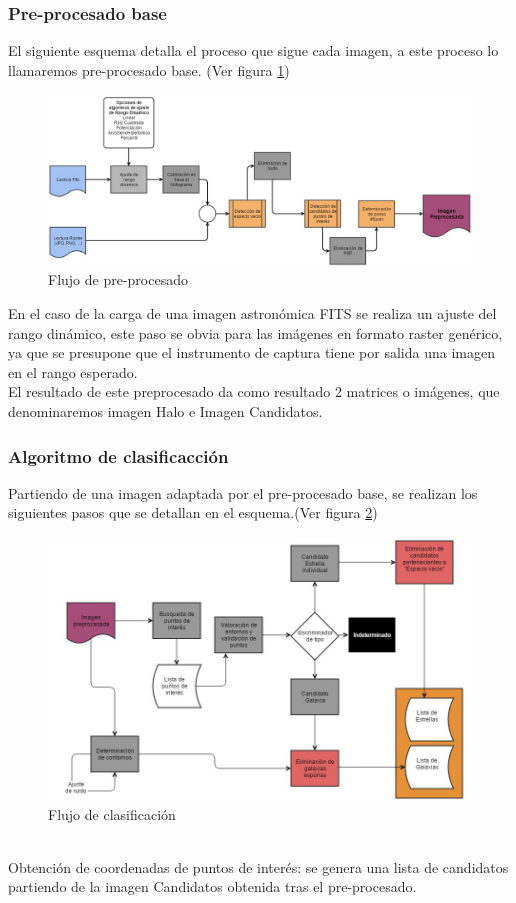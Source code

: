 	\subsubsection{Pre-procesado base}
	El siguiente esquema detalla el proceso que sigue cada imagen, a este proceso lo llamaremos pre-procesado base. (Ver figura \ref{fig:esquemaPreprocesado})\\
	\begin{figure}[!htb]
		\centering
		\includegraphics[width=1\textwidth]{images/tfg2016pipeline1.jpg}
		\caption{\label{fig:esquemaPreprocesado}Flujo de pre-procesado}
	\end{figure}
	En el caso de la carga de una imagen astronómica FITS se realiza un ajuste del rango dinámico, este paso se obvia para las imágenes en formato raster genérico, ya que se presupone que el instrumento de captura tiene por salida una imagen en el rango esperado.\\
	El resultado de este preprocesado da como resultado 2 matrices o imágenes, que denominaremos imagen Halo e Imagen Candidatos.
	\subsubsection{Algoritmo de clasificacción}
	Partiendo de una imagen adaptada por el pre-procesado base, se realizan los siguientes pasos que se detallan en el esquema.(Ver figura \ref{fig:esquemaClasificaciosn})\\
	\begin{figure}[!htb]
		\centering
		\includegraphics[width=1\textwidth]{images/tfg2016algoritmos_de_catalogaci_n.jpg}
		\caption{\label{fig:esquemaClasificaciosn}Flujo de clasificación}
	\end{figure}
	\\Obtención de coordenadas de puntos de interés: se genera una lista de candidatos partiendo de la imagen Candidatos obtenida tras el pre-procesado.
	
